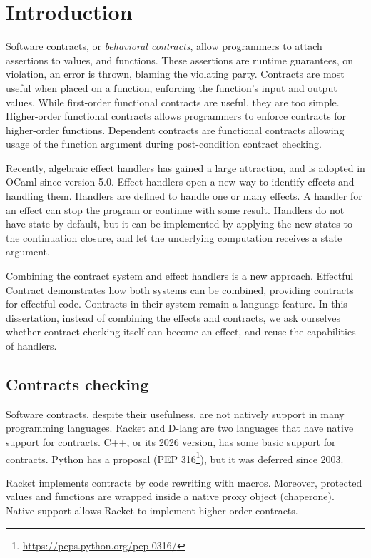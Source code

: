 \chapter{Introduction}

Software contracts, or \textit{behavioral contracts}, allow programmers to
attach assertions to values, and functions. These assertions are runtime
guarantees, on violation, an error is thrown, blaming the violating party.
Contracts are most useful when placed on a function, enforcing the function's
input and output values. While first-order functional contracts are useful,
they are too simple. Higher-order functional contracts allows programmers to
enforce contracts for higher-order functions. Dependent contracts are
functional contracts allowing usage of the function argument during
post-condition contract checking.

Recently, algebraic effect handlers has gained a large attraction, and is
adopted in OCaml since version 5.0. Effect handlers open a new way to identify
effects and handling them. Handlers are defined to handle one or many effects.
A handler for an effect can stop the program or continue with some result.
Handlers do not have state by default, but it can be implemented by applying
the new states to the continuation closure, and let the underlying computation
receives a state argument.

Combining the contract system and effect handlers is a new approach. Effectful
Contract \cite{10.1145/3632930} demonstrates how both systems can be combined,
providing contracts for effectful code. Contracts in their system remain a
language feature. In this dissertation, instead of combining the effects and
contracts, we ask ourselves whether contract checking itself can become an
effect, and reuse the capabilities of handlers.

\section{Contracts checking}

Software contracts, despite their usefulness, are not natively support in many
programming languages. Racket and D-lang are two languages that have native
support for contracts. C++, or its 2026 version, has some basic support for
contracts. Python has a proposal (PEP
316\footnote{\href{https://peps.python.org/pep-0316/}{https://peps.python.org/pep-0316/}}),
but it was deferred since 2003.

Racket implements contracts by code rewriting with macros. Moreover, protected
values and functions are wrapped inside a native proxy object (chaperone).
Native support allows Racket to implement higher-order contracts.

